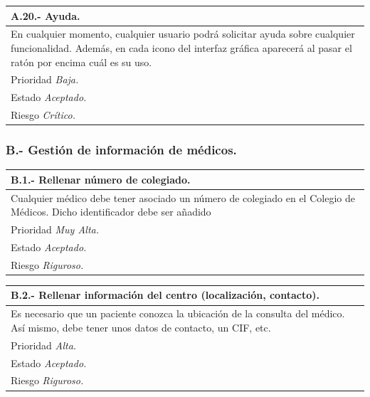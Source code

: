 \documentclass[a4paper,oneside,11pt]{book}
\begin{document}
\begin{center}
\begin{tabulary}{15cm}{|L|}
	\hline
		\bf{A.20.- Ayuda.} \\
	\hline
		En cualquier momento, cualquier usuario podrá solicitar ayuda sobre cualquier funcionalidad. Además, en cada icono del interfaz gráfica aparecerá al pasar el ratón por encima cuál es su uso. \\
	\hline
		Prioridad \textit{Baja.} \\
	\hline
		Estado \textit{Aceptado.} \\
	\hline
		Riesgo \textit{Crítico.} \\
	\hline
\end{tabulary}
\end{center}


\subsubsection{B.- Gestión de información de médicos.}

\begin{center}
\begin{tabulary}{15cm}{|L|}
	\hline
		\bf{B.1.- Rellenar número de colegiado.} \\
	\hline
		Cualquier médico debe tener asociado un número de colegiado en el Colegio de Médicos. Dicho identificador debe ser añadido \\
	\hline
		Prioridad \textit{Muy Alta.} \\
	\hline
		Estado \textit{Aceptado.} \\
	\hline
		Riesgo \textit{Riguroso.} \\
	\hline
\end{tabulary}
\end{center}

\begin{center}
\begin{tabulary}{15cm}{|L|}
	\hline
		\bf{B.2.- Rellenar información del centro (localización, contacto).} \\
	\hline
		Es necesario que un paciente conozca la ubicación de la consulta del médico. Así mismo, debe tener unos datos de contacto, un CIF, etc. \\
	\hline
		Prioridad \textit{Alta.} \\
	\hline
		Estado \textit{Aceptado.} \\
	\hline
		Riesgo \textit{Riguroso.} \\
	\hline
\end{tabulary}
\end{center}
\end{document}
